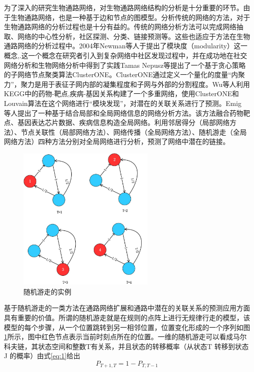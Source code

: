 为了深入的研究生物通路网络，对生物通路网络结构的分析是十分重要的环节。由于生物通路网络，也是一种基于边和节点的图模型。分析传统的网络的方法，对于生物通路网络的分析过程也是十分有益的。传统的网络分析方法可以完成网络抽取、网络的中心性分析，社区探测、分类、链接预测等。这些也适应于方法在生物通路网络的分析过程中。2004年Newman\cite{newman2006modularity}等人于提出了模块度（modularity）这一概念,.这一个概念在研究者引入到复杂网络中社区发现过程中，并在成功地在社交网络分析和生物网络分析中得到了实践Tamas Nepusz\cite{nepusz2012detecting}等提出了一个基于贪心策略的子网络节点聚类算法ClusterONE\cite{nepusz2012detecting}。ClusterONE通过定义一个量化的度量“内聚力”，聚力是用于表征子网内部的凝集程度和子网与外部的分割程度。Wu\cite{wu2013computational}等人利用KEGG\cite{kanehisa2008kegg}中的药物-靶点,疾病-基因关系构建了一个多重网络，使用ClusterONE\cite{nepusz2012detecting}和Louvain\cite{blondel2008fast}算法在这个网络进行“模块发现”，对潜在的关联关系进行了预测。Emig \cite{emig2013drug}等人提出了一种基于结合局部和全局网络信息的网络分析方法。该方法融合药物靶点、基因表达芯片数据、疾病信息构造全局网络。利用邻居得分（局部网络方法）、节点关联性（局部网络方法）、网络传播（全局网络方法）、随机游走（全局网络方法）四种方法分别对全局网络进行分析，预测了网络中潜在的链接。

\begin{figure}
\centering
\includegraphics[width = 0.6\textwidth]{rw}
\caption[fig2]{随机游走的实例}
\label{fig2}
\end{figure}


基于随机游走的一类方法在通路网络扩展和通路中潜在的关联关系的预测应用方面具有重要的价值。所谓的随机游走就是在规则的点阵上进行无规律行走的模型，该模型的每个步骤，从一个位置跳转到另一相邻位置，位置变化形成的一个序列如图\ref{fig2}所示，图中红色节点表示当前时刻点所在的位置。一维的随机游走可以看成马尔科夫链，其状态空间和整数T有关系，并且状态的转移概率（从状态T 转移到状态J 的概率）由式\ref{eq:1}给出
\begin{equation}\label{eq:1}
	P_{T+1,T} = 1-P_{T,T-1}
\end{equation}

